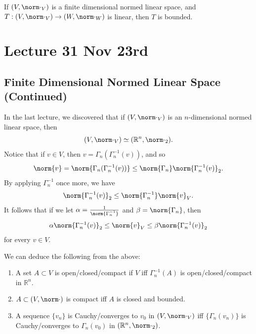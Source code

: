 \documentclass[notoc,notitlepage]{tufte-book}
\begin{document}
\begin{crly}\label{crly:all_linear_maps_from_a_finite_dimensional_normed_linear_space_to_any_normed_linear_space_is_bounded}
  If $(V, \norm\cdot_V)$ is a finite dimensional normed linear space, and $T : (V, \norm\cdot_V) \to (W, \norm\cdot_W)$ is linear, then $T$ is bounded.
\end{crly}



\chapter{Lecture 31 Nov 23rd}%
\label{chp:lecture_31_nov_23rd}

\section{Finite Dimensional Normed Linear Space (Continued)}%
\label{sec:finite_dimensional_normed_linear_space_continued}

In the last lecture, we discovered that if $(V, \norm\cdot_V)$ is an $n$-dimensional normed linear space, then
\begin{equation*}
  (V, \norm\cdot_V) \simeq (\mathbb{R}^n, \norm\cdot_2 ).
\end{equation*}
Notice that if $v \in V$, then $v = \Gamma_n(\Gamma_n^{-1}(v))$, and so
\begin{equation*}
  \norm{v} = \norm{ \Gamma_n( \Gamma_n^{-1}(v) ) } \leq \norm{ \Gamma_n } \norm{ \Gamma_n^{-1}(v) }_2.
\end{equation*}
By applying $\Gamma_n^{-1}$ once more, we have
\begin{equation*}
  \norm{ \Gamma_n^{-1}(v) }_2 \leq \norm{\Gamma_n^{-1}}\norm{v}_V.
\end{equation*}
It follows that if we let $\alpha = \frac{1}{\norm{\Gamma_n^{-1}}}$ and $\beta = \norm{\Gamma_n}$, then
\begin{equation*}
  \alpha \norm{ \Gamma_n^{-1}(v) }_2 \leq \norm{v}_V \leq \beta \norm{ \Gamma_n^{-1}(v) }_2
\end{equation*}
for every $v \in V$.

We can deduce the following from the above:
\begin{enumerate}
  \item A set $A \subset V$ is open/closed/compact if $V$ iff $\Gamma_n^{-1}(A)$ is open/closed/compact in $\mathbb{R}^n$.
  \item $A \subset (V, \norm\cdot)$ is compact iff $A$ is closed and bounded.
  \item A sequence $\{ v_n \}$ is Cauchy/converges to $v_0$ in $(V, \norm\cdot_V)$ iff $\{ \Gamma_n(v_n) \}$ is Cauchy/converges to $\Gamma_n(v_0)$ in $(\mathbb{R}^n, \norm\cdot_2)$.
\end{enumerate}
\end{document}
